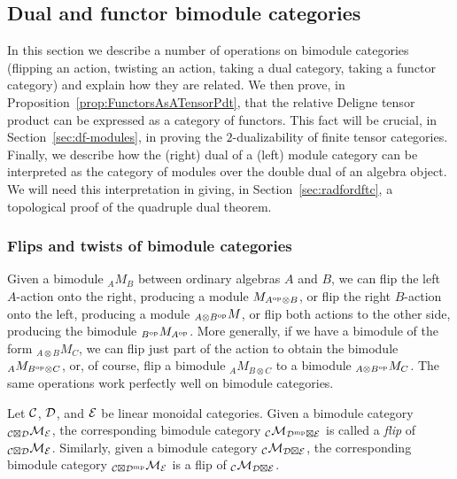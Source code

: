 \documentclass{amsart}
\begin{document}
\subsection{Dual and functor bimodule categories} \label{sec:tc-bimodules}

In this section we describe a number of operations on bimodule categories (flipping an action, twisting an action, taking a dual category, taking a functor category) and explain how they are related.  We then prove, in Proposition~\ref{prop:FunctorsAsATensorPdt}, that the relative Deligne tensor product can be expressed as a category of functors.  This fact will be crucial, in Section~\ref{sec:df-modules}, in proving the $2$-dualizability of finite tensor categories.  Finally, we describe how the (right) dual of a (left) module category can be interpreted as the category of modules over the double dual of an algebra object.  We will need this interpretation in giving, in Section~\ref{sec:radfordftc}, a topological proof of the quadruple dual theorem.

\subsubsection{Flips and twists of bimodule categories} \label{sec:fliptwist}

Given a bimodule ${}_A M_B$ between ordinary algebras $A$ and $B$, we can flip the left $A$-action onto the right, producing a module $M_{A^{\mathrm{op}} \otimes B}$, or flip the right $B$-action onto the left, producing a module ${}_{A \otimes B^{\mathrm{op}}} M$, or flip both actions to the other side, producing the bimodule ${}_{B^{\mathrm{op}}} M_{A^{\mathrm{op}}}$.  More generally, if we have a bimodule of the form ${}_{A \otimes B} M_C$, we can flip just part of the action to obtain the bimodule ${}_A M_{B^{\mathrm{op}} \otimes C}$, or, of course, flip a bimodule ${}_A M_{B \otimes C}$ to a bimodule ${}_{A \otimes B^{\mathrm{op}}} M_C$.  The same operations work perfectly well on bimodule categories.

\begin{definition}
Let $\mathcal C$, $\mathcal D$, and $\mathcal E$ be linear monoidal categories.  Given a bimodule category ${}_{\mathcal C \boxtimes \mathcal D} \mathcal M_\mathcal E$, the corresponding bimodule category ${}_{\mathcal C} \mathcal M_{\mathcal D^{\mathrm{mp}} \boxtimes \mathcal E}$ is called a \emph{flip} of ${}_{\mathcal C \boxtimes \mathcal D} \mathcal M_\mathcal E$.  Similarly, given a bimodule category ${}_\mathcal C \mathcal M_{\mathcal D \boxtimes \mathcal E}$, the corresponding bimodule category ${}_{\mathcal C \boxtimes \mathcal D^{\mathrm{mp}}} \mathcal M_\mathcal E$ is a flip of ${}_\mathcal C \mathcal M_{\mathcal D \boxtimes \mathcal E}$.
\end{definition}
\end{document}

